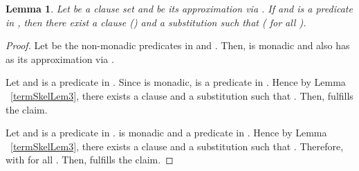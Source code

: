 \documentclass{llncs}
\newtheorem{lem}[theorem]{Lemma}
\begin{document}
\begin{lem}\label{termSkelLem4}
Let  be a clause set and  be its approximation via  . 
If   
and  is a predicate in , then there exist a clause 
  ()
and a substitution  such that
 ( for all ).
\end{lem}


\begin{proof}
Let  be the non-monadic predicates in  and  .
Then,  is monadic and also has  as its approximation via .

 Let  and  is a predicate in . Since  is monadic,  is a predicate in .
Hence by Lemma ~\ref{termSkelLem3}, there exists a clause  
and a substitution  such that . 
Then,  fulfills the claim.

Let  and  is a predicate in .  is monadic and a predicate in .
Hence by Lemma ~\ref{termSkelLem3}, there exists a clause  
and a substitution  such that .
Therefore,  with   for all .
Then,  fulfills the claim.
\end{proof}

 
\end{document}
